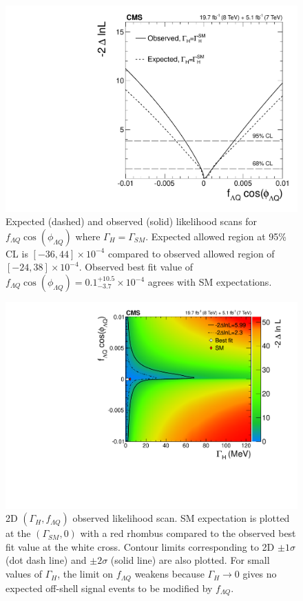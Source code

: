 \begin{figure}[htbp]
\begin{center}
\includegraphics[width=.9\linewidth]{HiggsProperties/figures/width_1DScan_fLQ.pdf}
\caption[Expected and Observed Limits on $f_{\Lambda Q}\cos(\phi_{\Lambda Q})$]{Expected (dashed) and observed (solid) likelihood scans for $f_{\Lambda Q}\cos(\phi_{\Lambda Q})$ where $\Gamma_{H}=\Gamma_{SM}$. Expected allowed region at 95\% CL is $[-36,44] \times 10^{-4}$ compared to observed allowed region of $[-24,38]\times 10^{-4}$. Observed best fit value of $f_{\Lambda Q}\cos(\phi_{\Lambda Q})=0.1 ^{+10.5}_{-3.7} \times 10^{-4}$ agrees with SM expectations.}
\label{fig:fLQLimits}
\end{center}
\end{figure}

\begin{figure}[htbp]
\begin{center}
\includegraphics[width=.9\linewidth]{HiggsProperties/figures/width_2DScan_obs_2lnL.pdf}
\caption[2D $(\Gamma_{H},f_{\Lambda Q})$ Observed Likelihood Scan]{2D $(\Gamma_{H},f_{\Lambda Q})$ observed likelihood scan. SM expectation is plotted at the $(\Gamma_{SM},0)$ with a red rhombus compared to the observed best fit value at the white cross. Contour limits corresponding to 2D $\pm1\sigma$ (dot dash line) and $\pm2\sigma$ (solid line) are also plotted. For small values of $\Gamma_H$, the limit on $f_{\Lambda Q}$ weakens because $\Gamma_H\rightarrow0$ gives no expected off-shell signal events to be modified by $f_{\Lambda Q}$.}
\label{fig:2DWidthScan}
\end{center}
\end{figure}


